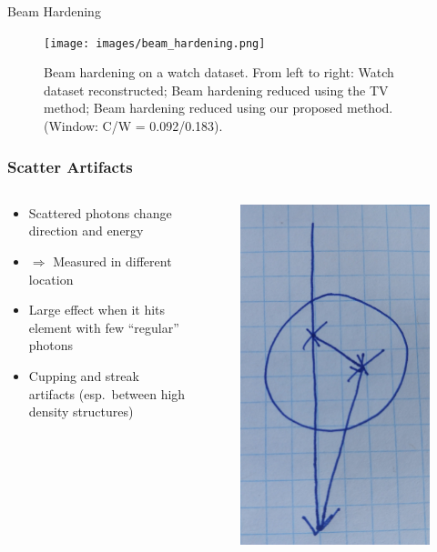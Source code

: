 \begin{frame}[t]{Beam Hardening}
	\begin{figure}[htpb]
		\centering
		\texttt{[image: images/beam\_hardening.png]}
		\caption{Beam hardening on a watch dataset. From left to right: Watch dataset reconstructed; Beam hardening reduced using the TV method; Beam hardening reduced using our proposed method. (Window: C/W = 0.092/0.183).}%
	\end{figure}
	\flushright{}
	\tiny
\end{frame}

\begin{frame}
	\frametitle{Scatter Artifacts}
	\begin{columns}[c, onlytextwidth]
		\begin{column}{0.75\textwidth}
		\begin{itemize}
			\item Scattered photons change direction and energy
			\item[ ] $\Rightarrow$ Measured in different location
			\item Large effect when it hits element with few ``regular'' photons

			\item Cupping and streak artifacts (esp.\ between high density structures)
		
		\end{itemize}
		\end{column}
		\begin{column}{0.25\textwidth}
		 \begin{figure}
			\centering
			\includegraphics[height=0.75\textwidth]{images/scatter_sketch}
		 \end{figure}
	\end{column}
	\end{columns}

\end{frame}
	

